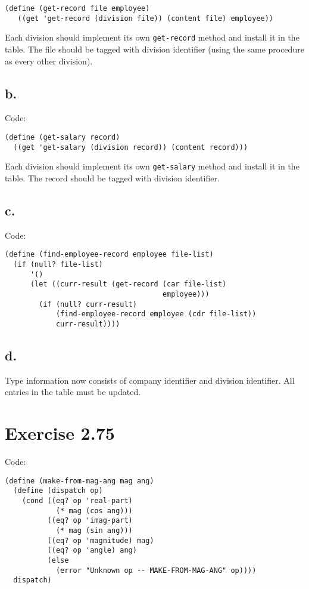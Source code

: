 \documentclass[../main.tex]{subfiles}
\begin{document}
\begin{lstlisting}
(define (get-record file employee)
   ((get 'get-record (division file)) (content file) employee))
\end{lstlisting}

Each division should implement its own
 \lstinline{get-record} method and install
 it in the table. The file should be tagged
 with division identifier (using the same
 procedure as every other division).

\subsection{b.}

Code:

\begin{lstlisting}
(define (get-salary record)
  ((get 'get-salary (division record)) (content record)))
\end{lstlisting}

Each division should implement its own
 \lstinline{get-salary} method and install
 it in the table. The record should be tagged
 with division identifier.

\subsection{c.}

Code:

\begin{lstlisting}
(define (find-employee-record employee file-list)
  (if (null? file-list)
      '()
      (let ((curr-result (get-record (car file-list)
                                     employee)))
        (if (null? curr-result)
            (find-employee-record employee (cdr file-list))
            curr-result))))
\end{lstlisting}

\subsection{d.}

Type information now consists of company identifier
 and division identifier. All entries in the table
 must be updated.

\section{Exercise 2.75}

Code:

\begin{lstlisting}
(define (make-from-mag-ang mag ang)
  (define (dispatch op)
    (cond ((eq? op 'real-part) 
            (* mag (cos ang)))
          ((eq? op 'imag-part)
            (* mag (sin ang)))
          ((eq? op 'magnitude) mag)
          ((eq? op 'angle) ang)
          (else
            (error "Unknown op -- MAKE-FROM-MAG-ANG" op))))
  dispatch)
\end{lstlisting}
\end{document}
